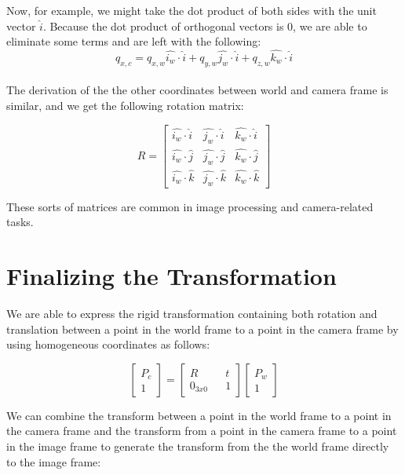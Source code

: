\documentclass[]{article}
\begin{document}
Now, for example, we might take the dot product of both sides with the unit vector $\hat{i}$. Because the dot product of orthogonal vectors is 0, we are able to eliminate some terms and are left with the following:
\begin{equation}
q_{x,c} = q_{x,w}\hat{i_w} \cdot \hat{i} + q_{y,w}\hat{j_w} \cdot \hat{i} + q_{z,w}\hat{k_w} \cdot \hat{i}
\end{equation}\\
The derivation of the the other coordinates between world and camera frame is similar, and we get the following rotation matrix:

\begin{equation}
R =
\begin{bmatrix}
\hat{i_w} \cdot \hat{i} & \hat{j_w} \cdot \hat{i} & \hat{k_w} \cdot \hat{i} \\
\hat{i_w} \cdot \hat{j} & \hat{j_w} \cdot \hat{j} & \hat{k_w} \cdot \hat{j} \\
\hat{i_w} \cdot \hat{k} & \hat{j_w} \cdot \hat{k} & \hat{k_w} \cdot \hat{k}
\end{bmatrix}
\end{equation}

These sorts of matrices are common in image processing and camera-related tasks.

\section{Finalizing the Transformation}
We are able to express the rigid transformation containing both rotation and translation between a point in the world frame to a point in the camera frame by using homogeneous coordinates as follows:

\begin{equation}
\begin{bmatrix}
P_c \\
1
\end{bmatrix}
=
\begin{bmatrix}
R && t \\
0_{3x0} && 1
\end{bmatrix}
\begin{bmatrix}
P_w \\ 1
\end{bmatrix}
\end{equation}

We can combine the transform between a point in the world frame to a point in the camera frame and the transform from a point in the camera frame to a point in the image frame to generate the transform from the the world frame directly to the image frame:
\end{document}
